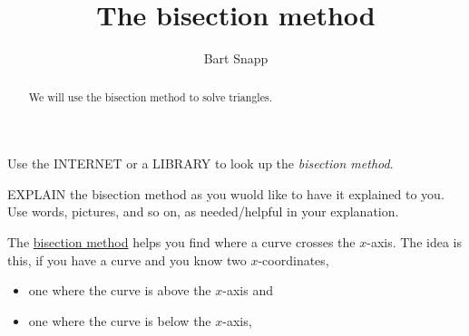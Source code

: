 \documentclass{ximera}
\title{The bisection method}
\author{Bart Snapp}
\begin{document}
\begin{abstract}
  We will use the bisection method to solve triangles.
\end{abstract}
\maketitle

\begin{question}
  Use the INTERNET or a LIBRARY to look up the \textit{bisection
    method}.

  EXPLAIN the bisection method as you wuold like to have it
  explained to you.  Use words, pictures, and so on, as needed/helpful
  in your explanation.
  \begin{freeResponse}
    The \underline{bisection method} helps you find where a curve
    crosses the $x$-axis. The idea is this, if you have a curve and
    you know two $x$-coordinates,
    \begin{itemize}
      \item one where the curve is above the
        $x$-axis and
      \item one where the curve is below the $x$-axis,
    \end{itemize}
    \begin{center}
\end{center}
\end{freeResponse}
\end{question}
\end{document}
